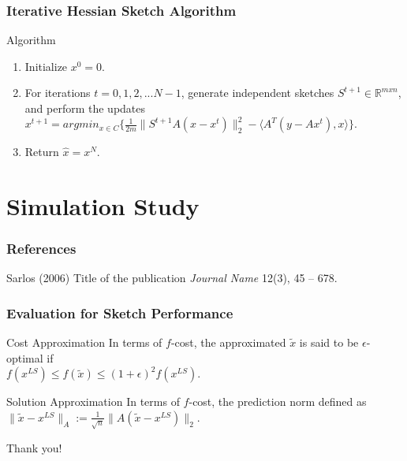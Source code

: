 \documentclass{beamer}
\begin{document}

\begin{frame}
\frametitle{Iterative Hessian Sketch Algorithm}
\begin{block}{Algorithm}
\begin{enumerate}
\item Initialize $x^0 = 0$.\\
\item For iterations $t=0,1,2,...N-1$, generate independent sketches $S^{t+1} \in \mathbb{R}^{mxn}$, and perform the updates \\
$x^{t+1} = argmin_{x\in C} \{\frac{1}{2m} \| S^{t+1} A (x-x^t)\|^2_2 - \langle A^T(y-Ax^t), x \rangle \}.$ \\
\item Return $\hat{x} = x^N$.  
\end{enumerate}
\end{block}

\end{frame}


\section{Simulation Study}

\begin{frame}
\end{frame}


\begin{frame}
\frametitle{References}
\footnotesize{
\begin{thebibliography}{99} 
 Sarlos (2006)
\newblock Title of the publication
\newblock \emph{Journal Name} 12(3), 45 -- 678.
\end{thebibliography}
}
\end{frame}

\begin{frame}
\frametitle{Evaluation for Sketch Performance}
\begin{block}{Cost Approximation}
In terms of $f$-cost, the approximated $\tilde{x}$ is said to be $\epsilon$-optimal if \\
\vspace{.5cm}
$f(x^{LS}) \leq f(\tilde{x}) \leq (1+\epsilon)^2 f(x^{LS})$.
\end{block}

\begin{block}{Solution Approximation}
In terms of $f$-cost, the prediction norm defined as \\
\vspace{.5cm}
$\|\tilde{x} - x^{LS}\|_A := \frac{1}{\sqrt{n}} \|A(\tilde{x} - x^{LS})\|_2$.
\end{block}

\end{frame}


\begin{frame}
    \begin{center}
        \Large Thank you!
    \end{center}
\end{frame}

\end{document}
